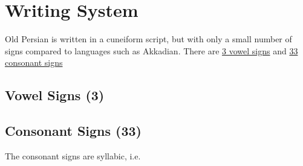 \section{Writing System}\cite{OmniglotOldPersian,Skjærvø2002OldPersian}

Old Persian is written in a cuneiform script, but with only a small number of signs compared to languages such as
Akkadian. There are \hyperref[Vowel Signs]{3 vowel signs} and \hyperref[Consonant Signs]{33 consonant signs}

\subsection{Vowel Signs (3)}
\label{Vowel Signs}

 \space\space\space\space\space
{} \space\space\space\space\space
{} \space\space\space\space\space

\subsection{Consonant Signs (33)}
\label{Consonant Signs}

The consonant signs are syllabic, i.e.

